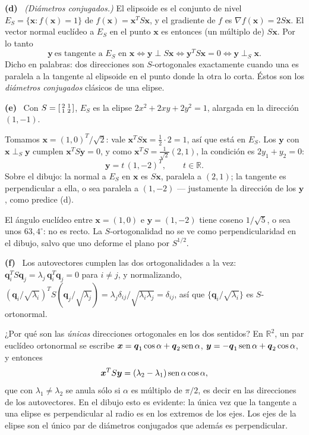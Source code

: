 \documentclass[11pt,a4paper]{article}
\newcommand{\bi}[1]{\boldsymbol{#1}}
\newcommand{\R}{\mathbb{R}}
\newcommand{\bq}{\bi{q}}  \newcommand{\bx}{\bi{x}}  \newcommand{\by}{\bi{y}}
\newcommand{\itemsol}[1]{\par\medskip\noindent\textbf{(#1)}\ \ignorespaces}
\begin{document}
\itemsol{d} \emph{(Diámetros conjugados.)} El elipsoide es el conjunto de nivel
$E_S=\{\bx:f(\bx)=1\}$ de $f(\bx)=\bx^TS\bx$, y el gradiente de $f$ es
$\nabla f(\bx)=2S\bx$. El vector normal euclídeo a $E_S$ en el punto $\bx$ es
entonces (un múltiplo de) $S\bx$. Por lo tanto
\[
\by\ \text{es tangente a }E_S\text{ en }\bx
\iff \by\perp S\bx\iff \by^TS\bx=0\iff \by\perp_S\bx .
\]
Dicho en palabras: dos direcciones son $S$-ortogonales exactamente cuando una es
paralela a la tangente al elipsoide en el punto donde la otra lo corta. Éstos son
los \emph{diámetros conjugados} clásicos de una elipse.

\itemsol{e} Con $S=\begin{bsmallmatrix}2&1\\1&2\end{bsmallmatrix}$, $E_S$ es la
elipse $2x^2+2xy+2y^2=1$, alargada en la dirección $(1,-1)$.

Tomamos $\bx=(1,0)^T/\sqrt2$: vale $\bx^TS\bx=\tfrac12\cdot2=1$, así que está en
$E_S$. Los $\by$ con $\bx\perp_S\by$ cumplen $\bx^TS\by=0$, y como
$\bx^TS=\tfrac{1}{\sqrt2}(2,1)$, la condición es $2y_1+y_2=0$:
\[
\by=t\,(1,-2)^T,\qquad t\in\R .
\]
Sobre el dibujo: la normal a $E_S$ en $\bx$ es $S\bx$, paralela a $(2,1)$; la
tangente es perpendicular a ella, o sea paralela a $(1,-2)$ --- justamente la
dirección de los $\by$, como predice (d).

El ángulo euclídeo entre $\bx=(1,0)$ e $\by=(1,-2)$ tiene coseno $1/\sqrt5$, o
sea unos $63{,}4^\circ$: no es recto. La $S$-ortogonalidad no se ve como
perpendicularidad en el dibujo, salvo que uno deforme el plano por $S^{1/2}$.

\itemsol{f} Los autovectores cumplen las dos ortogonalidades a la vez:
$\bq_i^TS\bq_j=\lambda_j\,\bq_i^T\bq_j=0$ para $i\neq j$, y normalizando,
$(\bq_i/\sqrt{\lambda_i})^TS(\bq_j/\sqrt{\lambda_j})
=\lambda_j\delta_{ij}/\sqrt{\lambda_i\lambda_j}=\delta_{ij}$, así que
$\{\bq_i/\sqrt{\lambda_i}\}$ es $S$-ortonormal.

¿Por qué son las \emph{únicas} direcciones ortogonales en los dos sentidos? En
$\R^2$, un par euclídeo ortonormal se escribe
$\bx=\bq_1\cos\alpha+\bq_2\sen\alpha$, $\by=-\bq_1\sen\alpha+\bq_2\cos\alpha$, y
entonces
\[
\bx^TS\by=(\lambda_2-\lambda_1)\sen\alpha\cos\alpha ,
\]
que con $\lambda_1\neq\lambda_2$ se anula sólo si $\alpha$ es múltiplo de
$\pi/2$, es decir en las direcciones de los autovectores. En el dibujo esto es
evidente: la única vez que la tangente a una elipse es perpendicular al radio es
en los extremos de los ejes. Los ejes de la elipse son el único par de diámetros
conjugados que además es perpendicular.
\end{document}
